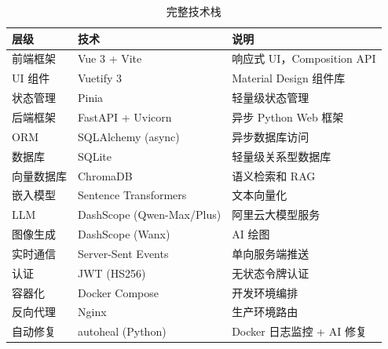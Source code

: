 \documentclass[12pt,a4paper]{ctexart}
\begin{document}
\begin{table}[htbp]
\centering
\begin{tabular}{@{}llp{6cm}@{}}
\toprule
\textbf{层级} & \textbf{技术} & \textbf{说明} \\
\midrule
前端框架 & Vue 3 + Vite & 响应式 UI，Composition API \\
UI 组件 & Vuetify 3 & Material Design 组件库 \\
状态管理 & Pinia & 轻量级状态管理 \\
后端框架 & FastAPI + Uvicorn & 异步 Python Web 框架 \\
ORM & SQLAlchemy (async) & 异步数据库访问 \\
数据库 & SQLite & 轻量级关系型数据库 \\
向量数据库 & ChromaDB & 语义检索和 RAG \\
嵌入模型 & Sentence Transformers & 文本向量化 \\
LLM & DashScope (Qwen-Max/Plus) & 阿里云大模型服务 \\
图像生成 & DashScope (Wanx) & AI 绘图 \\
实时通信 & Server-Sent Events & 单向服务端推送 \\
认证 & JWT (HS256) & 无状态令牌认证 \\
容器化 & Docker Compose & 开发环境编排 \\
反向代理 & Nginx & 生产环境路由 \\
自动修复 & autoheal (Python) & Docker 日志监控 + AI 修复 \\
\bottomrule
\end{tabular}
\caption{完整技术栈}
\end{table}
\end{document}
